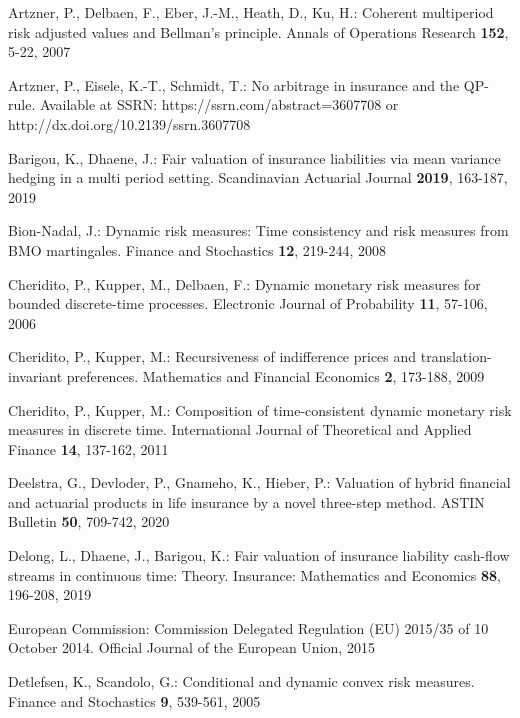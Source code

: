 \documentclass[11pt,a4paper]{article}
\begin{document}
\begin{thebibliography}{}
Artzner, P., Delbaen, F., Eber, J.-M., Heath, D., Ku, H.:
Coherent multiperiod risk adjusted values and Bellman's principle.
Annals of Operations Research {\bf 152}, 5-22, 2007

Artzner, P., Eisele, K.-T., Schmidt, T.:
No arbitrage in insurance and the QP-rule.
Available at SSRN: https://ssrn.com/abstract=3607708 or http://dx.doi.org/10.2139/ssrn.3607708

Barigou, K., Dhaene, J.: 
Fair valuation of insurance liabilities via mean variance hedging in a multi period setting.
Scandinavian Actuarial Journal {\bf 2019}, 163-187, 2019

Bion-Nadal, J.: 
Dynamic risk measures: Time consistency and risk measures from BMO martingales. 
Finance and Stochastics {\bf 12}, 219-244, 2008

Cheridito, P., Kupper, M., Delbaen, F.: 
Dynamic monetary risk measures for bounded discrete-time processes.
Electronic Journal of Probability {\bf 11}, 57-106, 2006

Cheridito, P., Kupper, M.: 
Recursiveness of indifference prices and translation-invariant preferences.
Mathematics and Financial Economics {\bf 2}, 173-188, 2009

Cheridito, P., Kupper, M.: 
Composition of time-consistent dynamic monetary risk measures in discrete time.
International Journal of Theoretical and Applied Finance {\bf 14}, 137-162, 2011

Deelstra, G., Devloder, P., Gnameho, K., Hieber, P.:
Valuation of hybrid financial and actuarial products in life insurance by a novel three-step method.
ASTIN Bulletin {\bf 50}, 709-742, 2020

Delong, L., Dhaene, J., Barigou, K.:
Fair valuation of insurance liability cash-flow streams in continuous time: Theory. 
Insurance: Mathematics and Economics {\bf 88}, 196-208, 2019

European Commission:
Commission Delegated Regulation (EU) 2015/35 of 10 October 2014.
Official Journal of the European Union, 2015

Detlefsen, K., Scandolo, G.:
Conditional and dynamic convex risk measures. 
Finance and Stochastics {\bf 9}, 539-561, 2005


\end{thebibliography}
\end{document}
